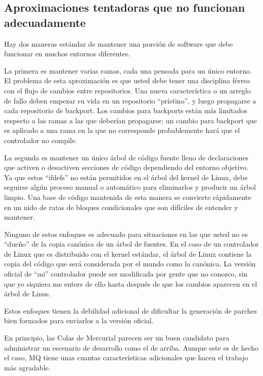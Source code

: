 \subsection{Aproximaciones tentadoras que no funcionan adecuadamente}

Hay dos maneras estándar de mantener una porción de software que debe
funcionar en muchos entornos diferentes.

La primera es mantener varias ramas, cada una pensada para un único
entorno. El problema de esta aproximación es que usted debe tener una
disciplina férrea con el flujo de cambios entre repositorios. Una
nueva característica o un arreglo de fallo deben empezar su vida en un
repositorio ``prístino'', y luego propagarse a cada repositorio de
backport. Los cambios para backports están más limitados respecto a
las ramas a las que deberían propagarse; un cambio para backport que
es aplicado a una rama en la que no corresponde probablemente hará que
el controlador no compile.

La segunda es mantener un único árbol de código fuente lleno de
declaraciones que activen o desactiven secciones de código dependiendo
del entorno objetivo. Ya que estos ``ifdefs'' no están permitidos en
el árbol del kernel de Linux, debe seguirse algún proceso manual o
automático para eliminarlos y producir un árbol limpio. Una base de
código mantenida de esta manera se convierte rápidamente en un nido de
ratas de bloques condicionales que son difíciles de entender y
mantener.

Ninguno de estos enfoques es adecuado para situaciones en las que
usted no es ``dueño'' de la copia canónica de un árbol de fuentes. En
el caso de un controlador de Linux que es distribuido con el kernel
estándar, el árbol de Linux contiene la copia del código que será
considerada por el mundo como la canónica. La versión oficial de
``mi'' controlador puede ser modificada por gente que no conozco, sin
que yo siquiera me entere de ello hasta después de que los cambios
aparecen en el árbol de Linus.

Estos enfoques tienen la debilidad adicional de dificultar la
generación de parches bien formados para enviarlos a la versión
oficial.

En principio, las Colas de Mercurial parecen ser un buen candidato
para administrar un escenario de desarrollo como el de arriba. Aunque
este es de hecho el caso, MQ tiene unas cuantas características
adicionales que hacen el trabajo más agradable.

